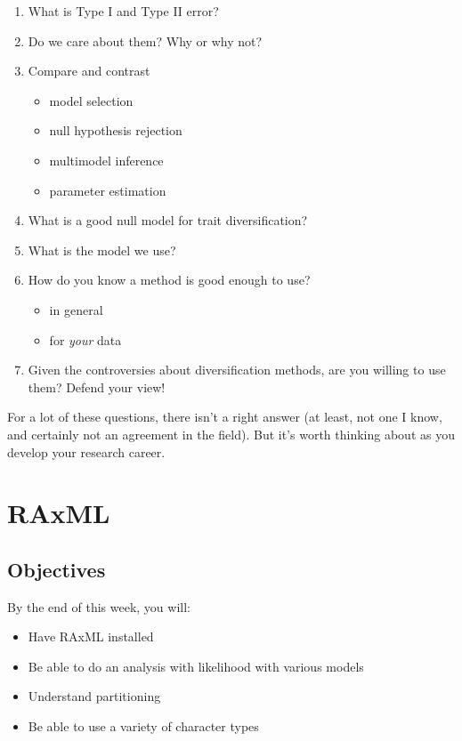 \documentclass[]{article}
\providecommand{\tightlist}{%
  \setlength{\itemsep}{0pt}\setlength{\parskip}{0pt}}
\begin{document}
\begin{enumerate}
\def\labelenumi{\arabic{enumi}.}
\tightlist
\item
  What is Type I and Type II error?
\item
  Do we care about them? Why or why not?
\item
  Compare and contrast

  \begin{itemize}
  \tightlist
  \item
    model selection
  \item
    null hypothesis rejection
  \item
    multimodel inference
  \item
    parameter estimation
  \end{itemize}
\item
  What is a good null model for trait diversification?
\item
  What is the model we use?
\item
  How do you know a method is good enough to use?

  \begin{itemize}
  \tightlist
  \item
    in general
  \item
    for \emph{your} data
  \end{itemize}
\item
  Given the controversies about diversification methods, are you willing to use them? Defend your view!
\end{enumerate}

For a lot of these questions, there isn't a right answer (at least, not one I know, and certainly not an agreement in the field). But it's worth thinking about as you develop your research career.

\hypertarget{raxml}{%
\section{RAxML}\label{raxml}}

\hypertarget{objectives-6}{%
\subsection{Objectives}\label{objectives-6}}

By the end of this week, you will:

\begin{itemize}
\tightlist
\item
  Have RAxML installed
\item
  Be able to do an analysis with likelihood with various models
\item
  Understand partitioning
\item
  Be able to use a variety of character types
\end{itemize}
\end{document}

